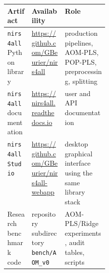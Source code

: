 \begin{tabularx}{\linewidth}{p{0.24\linewidth}X X}
\toprule
Artifact & Availability & Role \\
\midrule
\texttt{nirs4all} Python library & \url{https://github.com/GBeurier/nirs4all} & production pipelines, AOM-PLS, POP-PLS, preprocessing, splitting \\
\texttt{nirs4all} documentation & \url{https://nirs4all.readthedocs.io} & user and API documentation \\
\texttt{nirs4all Studio} & \url{https://github.com/GBeurier/nirs4all-webapp} & desktop graphical interface using the same library stack \\
Research benchmark code & repository subdirectory \texttt{bench/AOM\_v0} & AOM-PLS/Ridge experiments, audit tables, scripts \\
\bottomrule
\end{tabularx}
